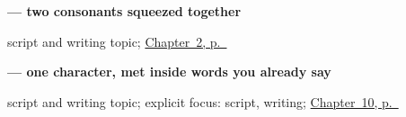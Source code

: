 \noindent\begin{minipage}[t]{\linewidth}
\raggedright
\textbf{ — two consonants squeezed together}\par
\footnotesize script and writing topic; \hyperref[ch:introductions]{Chapter~2, p.~\pageref*{ch:introductions}}
\end{minipage}\par\smallskip

\noindent\begin{minipage}[t]{\linewidth}
\raggedright
\textbf{ — one character, met inside words you already say}\par
\footnotesize script and writing topic; explicit focus: script, writing; \hyperref[ch:hi-days-of-the-week]{Chapter~10, p.~\pageref*{ch:hi-days-of-the-week}}
\end{minipage}\par\smallskip
